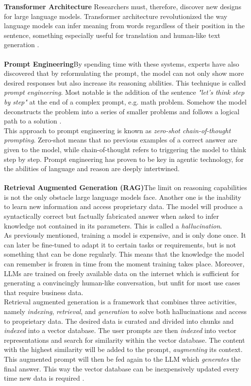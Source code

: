 \textbf{Transformer Architecture} \indent Researchers must, therefore, discover new designs for large language models. Transformer architecture revolutionized the way language models can infer meaning from words regardless of their position in the sentence, something especially useful for translation and human-like text generation \parencite{Vaswani.12.06.2017}. \\\\
\textbf{Prompt Engineering}\indent By spending time with these systems, experts have also discovered that by reformulating the prompt, the model can not only show more desired responses but also increase its reasoning abilities. This technique is called \textit{prompt engineering}. Most notable is the addition of the sentence \textit{"let's think step by step"} at the end of a complex prompt, e.g. math problem. Somehow the model deconstructs the problem into a series of smaller problems and follows a logical path to a solution \parencite[cf.][pp. 3-4]{Kojima.24.05.2022}. \\
This approach to prompt engineering is known as \textit{zero-shot chain-of-thought prompting}. Zero-shot means that no previous examples of a correct answer are given to the model, while chain-of-thought refers to triggering the model to think step by step. Prompt engineering has proven to be key in agentic technology, for the abilities of language and reason are deeply intertwined.\\\\
\textbf{Retrieval Augmented Generation (RAG)}\indent  The limit on reasoning capabilities is not the only obstacle large language models face. Another one is the inability to learn new information and access proprietary data. The model will produce a syntactically correct but factually fabricated answer when asked to infer knowledge not contained in its parameters. This is called a \textit{hallucination}.\\
As previously mentioned, training a model is expensive, and is only done once. It can later be fine-tuned to adapt it to certain tasks or requirements, but is not something that can be done regularly. This means that the knowledge the model can remember is frozen in time from the moment training takes place. Moreover, LLMs are trained on freely available data on the internet which is sufficient for generating a convincingly human-like conversation, but unfit for most use cases that require business data.\\
Retrieval augmented generation is a framework that combines three activities, namely \textit{indexing}, \textit{retrieval}, and \textit{generation} to solve both hallucinations and access to proprietary data. The desired data is curated and divided into chunks and \textit{indexed} into a vector database. The user prompts are then \textit{indexed} into vector representations and search for similarity within the vector database. The content with the highest similarity will be added to the prompt, \textit{augmenting} its context. This augmented prompt will then be fed again to the LLM which \textit{generates} the final answer. This way the vector database can be inexpensively updated every time new data is required \parencite[cf.][p. 3]{huang_survey_2024}. \\\\

